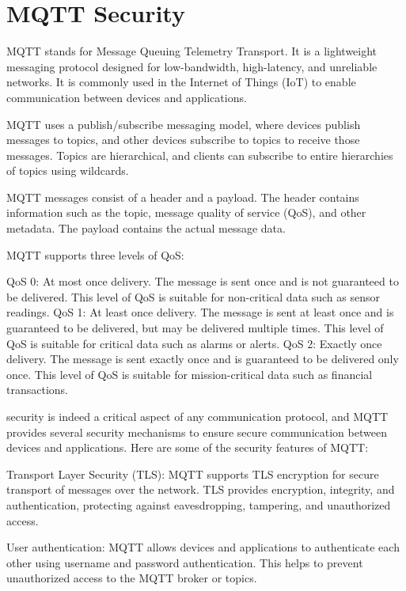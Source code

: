 \section{MQTT Security}
\label{sec:report}

MQTT stands for Message Queuing Telemetry Transport. It is a lightweight messaging protocol designed for low-bandwidth, high-latency, and unreliable networks. It is commonly used in the Internet of Things (IoT) to enable communication between devices and applications.

MQTT uses a publish/subscribe messaging model, where devices publish messages to topics, and other devices subscribe to topics to receive those messages. Topics are hierarchical, and clients can subscribe to entire hierarchies of topics using wildcards.

MQTT messages consist of a header and a payload. The header contains information such as the topic, message quality of service (QoS), and other metadata. The payload contains the actual message data.

MQTT supports three levels of QoS:

QoS 0: At most once delivery. The message is sent once and is not guaranteed to be delivered. This level of QoS is suitable for non-critical data such as sensor readings.
QoS 1: At least once delivery. The message is sent at least once and is guaranteed to be delivered, but may be delivered multiple times. This level of QoS is suitable for critical data such as alarms or alerts.
QoS 2: Exactly once delivery. The message is sent exactly once and is guaranteed to be delivered only once. This level of QoS is suitable for mission-critical data such as financial transactions.

security is indeed a critical aspect of any communication protocol, and MQTT provides several security mechanisms to ensure secure communication between devices and applications. Here are some of the security features of MQTT:

Transport Layer Security (TLS): MQTT supports TLS encryption for secure transport of messages over the network. TLS provides encryption, integrity, and authentication, protecting against eavesdropping, tampering, and unauthorized access.

User authentication: MQTT allows devices and applications to authenticate each other using username and password authentication. This helps to prevent unauthorized access to the MQTT broker or topics.

